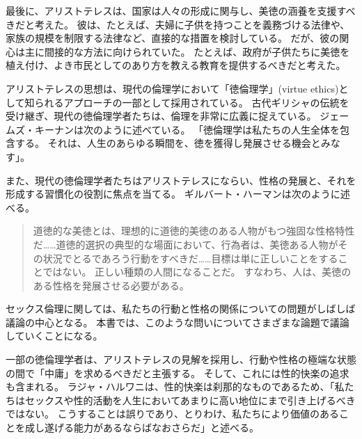 \documentclass[paper=a4,book,openany]{jlreq}
\begin{document}
最後に、アリストテレスは、国家は人々の形成に関与し、美徳の涵養を支援すべきだと考えた。
彼は、たとえば、夫婦に子供を持つことを義務づける法律や、家族の規模を制限する法律など、直接的な措置を検討している。
だが、彼の関心は主に間接的な方法に向けられていた。
たとえば、政府が子供たちに美徳を植え付け、よき市民としてのあり方を教える教育を提供するべきだと考えた。

アリストテレスの思想は、現代の倫理学において「徳倫理学」(virtue ethics)として知られるアプローチの一部として採用されている。
古代ギリシャの伝統を受け継ぎ、現代の徳倫理学者たちは、倫理を非常に広義に捉えている。
ジェームズ・キーナンは次のように述べている。
「徳倫理学は私たちの人生全体を包含する。
それは、人生のあらゆる瞬間を、徳を獲得し発展させる機会とみなす」\citep[p.185]{keenan05:_virtue}。

また、現代の徳倫理学者たちはアリストテレスにならい、性格の発展と、それを形成する習慣化の役割に焦点を当てる。
ギルバート・ハーマンは次のように述べる。

\begin{quote}
  道徳的な美徳とは、理想的に道徳的美徳のある人物がもつ強固な性格特性だ……道徳的選択の典型的な場面において、行為者は、美徳ある人物がその状況でとるであろう行動をすべきだ……目標は単に正しいことをすることではない。
正しい種類の人間になることだ。
すなわち、人は、美徳のある性格を発展させる必要がある。
\citep[][pp. 119-120]{harman99:_virtue_ethic_charac_trait}
\end{quote}

セックス倫理に関しては、私たちの行動と性格の関係についての問題がしばしば議論の中心となる。
本書では、このような問いについてさまざまな論題で議論していくことになる。

一部の徳倫理学者は、アリストテレスの見解を採用し、行動や性格の極端な状態の間で「中庸」を求めるべきだと主張する。
そして、これには性的快楽の追求も含まれる。
ラジャ・ハルワニは、性的快楽は刹那的なものであるため、「私たちはセックスや性的活動を人生においてあまりに高い地位にまで引き上げるべきではない。
こうすることは誤りであり、とりわけ、私たちにより価値のあることを成し遂げる能力があるならばなおさらだ」と述べる\citep[p.183]{halwani10:_philos_love_sex_marriag}。
\end{document}
